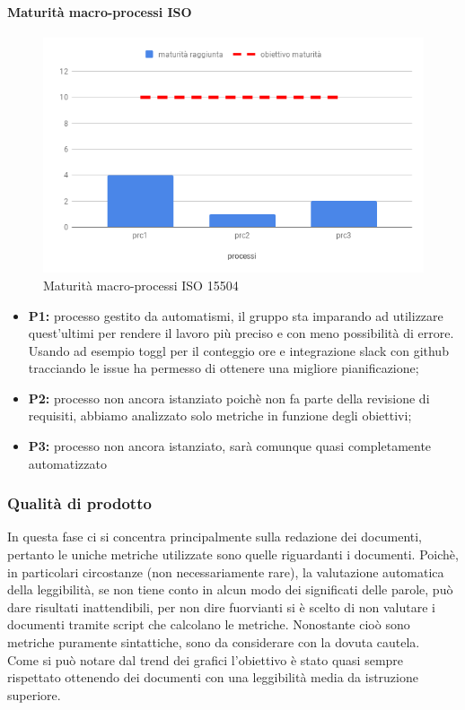 \paragraph{Maturità macro-processi ISO }
\hspace{15cm}
\begin{figure}[h!]
	\centering
	\includegraphics[scale=0.5]{MaturitaProcessi.png}
	\caption{Maturità macro-processi ISO 15504}
\end{figure}
\begin{itemize}
	\item \textbf{P1:} processo gestito da automatismi, il gruppo sta imparando ad utilizzare quest'ultimi per rendere il lavoro più preciso e con meno possibilità di errore. Usando ad esempio toggl per il conteggio ore e integrazione slack con github tracciando le issue ha
	permesso di ottenere una migliore pianificazione;
	\item \textbf{P2:} processo non ancora istanziato poichè non fa parte della revisione di requisiti, abbiamo analizzato solo metriche in funzione degli obiettivi;
	\item \textbf{P3:} processo non ancora istanziato, sarà comunque quasi completamente automatizzato
\end{itemize}
\clearpage
\subsubsection{Qualità di prodotto}
In questa fase ci si concentra principalmente sulla redazione dei documenti, pertanto le uniche metriche utilizzate sono quelle riguardanti i documenti.
Poichè, in particolari circostanze (non necessariamente rare), la valutazione automatica della leggibilità, se non tiene conto in alcun modo dei significati delle parole, può dare risultati inattendibili, per non dire fuorvianti si è scelto di non valutare i documenti tramite script che calcolano le metriche.
Nonostante cioò sono metriche puramente sintattiche, sono da considerare con la dovuta cautela. \\
Come si può notare dal trend dei grafici l'obiettivo è stato quasi sempre rispettato ottenendo dei documenti con una leggibilità media da istruzione superiore.
	\clearpage
